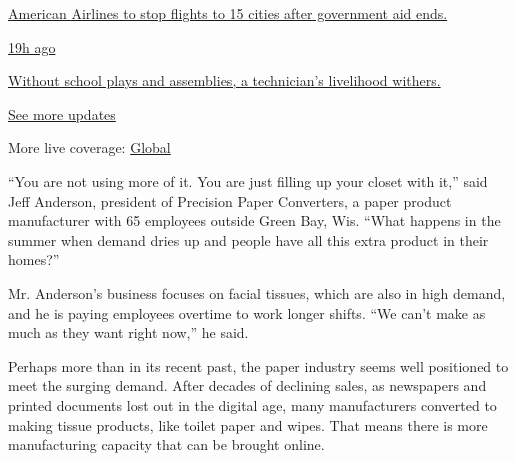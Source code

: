 \href{https://www.nytimes3xbfgragh.onion/live/2020/08/20/business/stock-market-today-coronavirus?action=click\&pgtype=Article\&state=default\&region=MAIN_CONTENT_1\&context=storylines_live_updates\#american-airlines-to-stop-flights-to-15-cities-after-government-aid-ends}{American
Airlines to stop flights to 15 cities after government aid ends.}

\href{https://www.nytimes3xbfgragh.onion/live/2020/08/20/business/stock-market-today-coronavirus?action=click\&pgtype=Article\&state=default\&region=MAIN_CONTENT_1\&context=storylines_live_updates\#without-school-plays-and-assemblies-a-technicians-livelihood-withers}{19h
ago}

\href{https://www.nytimes3xbfgragh.onion/live/2020/08/20/business/stock-market-today-coronavirus?action=click\&pgtype=Article\&state=default\&region=MAIN_CONTENT_1\&context=storylines_live_updates\#without-school-plays-and-assemblies-a-technicians-livelihood-withers}{Without
school plays and assemblies, a technician's livelihood withers.}

\href{https://www.nytimes3xbfgragh.onion/live/2020/08/20/business/stock-market-today-coronavirus?action=click\&pgtype=Article\&state=default\&region=MAIN_CONTENT_1\&context=storylines_live_updates}{See
more updates}

More live coverage:
\href{https://www.nytimes3xbfgragh.onion/2020/08/20/world/coronavirus-covid.html?action=click\&pgtype=Article\&state=default\&region=MAIN_CONTENT_1\&context=storylines_live_updates}{Global}

``You are not using more of it. You are just filling up your closet with
it,'' said Jeff Anderson, president of Precision Paper Converters, a
paper product manufacturer with 65 employees outside Green Bay, Wis.
``What happens in the summer when demand dries up and people have all
this extra product in their homes?''

Mr. Anderson's business focuses on facial tissues, which are also in
high demand, and he is paying employees overtime to work longer shifts.
``We can't make as much as they want right now,'' he said.

Perhaps more than in its recent past, the paper industry seems well
positioned to meet the surging demand. After decades of declining sales,
as newspapers and printed documents lost out in the digital age, many
manufacturers converted to making tissue products, like toilet paper and
wipes. That means there is more manufacturing capacity that can be
brought online.

